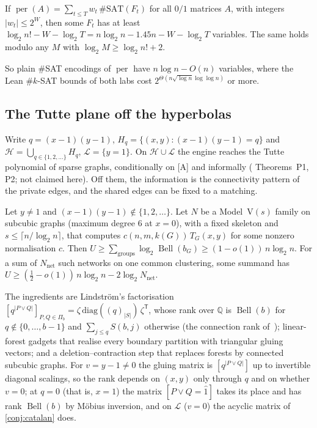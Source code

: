\documentclass[10pt]{amsart}
\theoremstyle{plain}
\theoremstyle{definition}
\theoremstyle{remark}
\numberwithin{equation}{section}
\newcommand{\A}{\textup{[A]}}
\newcommand{\Q}{\mathbb{Q}}
\newcommand{\per}{\operatorname{per}}
\newcommand{\Bell}{\operatorname{Bell}}
\begin{document}
\begin{proposition}\label{prop:entropy}
If $\per(A)=\sum_{t\le T}w_t\,\#\mathrm{SAT}(F_t)$ for all $0/1$ matrices $A$, with integers
$|w_t|\le2^W$, then some $F_t$ has at least $\log_2n!-W-\log_2T=n\log_2n-1.45n-W-\log_2T$ variables.
The same holds modulo any $M$ with $\log_2M\ge\log_2n!+2$.
\end{proposition}

\noindent So plain $\#$SAT encodings of $\per$ have $n\log n-O(n)$ variables, where the Lean
$\#k$-SAT bounds of both labs cost $2^{\Theta(n\sqrt{\log n}\log\log n)}$ or more.

\subsection{The Tutte plane off the hyperbolas}\label{sec:tutte}
Write $q=(x-1)(y-1)$, $H_q=\{(x,y):(x-1)(y-1)=q\}$ and $\mathcal H=\bigcup_{q\in\{1,2,\dots\}}H_q$,
$\mathcal L=\{y=1\}$. On $\mathcal H\cup\mathcal L$ the engine reaches the Tutte polynomial of sparse
graphs, conditionally on \A{} and informally ( Theorems~P1, P2; not claimed
here). Off them, the information is the connectivity pattern of the private edges, and the shared
edges can be fixed to a matching.

\begin{proposition}\label{prop:tutte}
Let $y\ne1$ and $(x-1)(y-1)\notin\{1,2,\dots\}$. Let $N$ be a Model~V$(s)$ family on subcubic graphs
(maximum degree $6$ at $x=0$), with a fixed skeleton and $s\le\lceil n/\log_2n\rceil$, that computes
$c(n,m,k(G))\,T_G(x,y)$ for some nonzero normalisation $c$. Then
$U\ge\sum_{\text{groups}}\log_2\Bell(b_G)\ge(1-o(1))\,n\log_2n$. For a sum of $N_{\mathrm{net}}$ such
networks on one common clustering, some summand has
$U\ge(\tfrac12-o(1))\,n\log_2n-2\log_2N_{\mathrm{net}}$.
\end{proposition}

\noindent The ingredients are Lindstr\"om's factorisation~\cite{Lindstrom69,Wilf68}
$[q^{|P\vee Q|}]_{P,Q\in\Pi_b}=\zeta\,\mathrm{diag}((q)_{|S|})\,\zeta^{\mathsf T}$, whose rank over $\Q$ is
$\Bell(b)$ for $q\notin\{0,\dots,b-1\}$ and $\sum_{j\le q}S(b,j)$ otherwise (the connection rank
of~\cite{FLS07,Lovasz12}); linear-forest gadgets that realise every boundary partition with
triangular gluing vectors; and a deletion--contraction step that replaces forests by connected
subcubic graphs. For $v=y-1\ne0$ the gluing matrix is $[q^{|P\vee Q|}]$ up to invertible diagonal
scalings, so the rank depends on $(x,y)$ only through $q$ and on whether $v=0$; at $q=0$ (that is,
$x=1$) the matrix $[P\vee Q=\hat1]$ takes its place and has rank $\Bell(b)$ by M\"obius inversion, and on
$\mathcal L$ ($v=0$) the acyclic matrix of \cref{conj:catalan} does.
\end{document}
